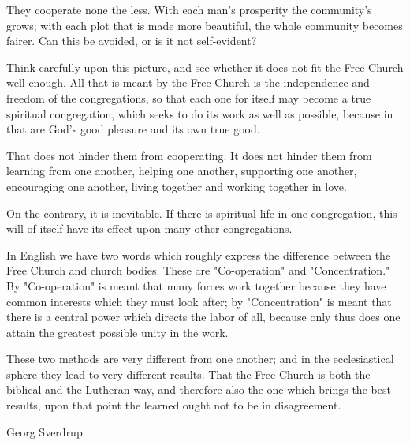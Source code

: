 They cooperate none the less. With each man’s prosperity the community’s grows; with each plot that is made more beautiful, the whole community becomes fairer. Can this be avoided, or is it not self-evident?

Think carefully upon this picture, and see whether it does not fit the Free Church well enough. All that is meant by the Free Church is the independence and freedom of the congregations, so that each one for itself may become a true spiritual congregation, which seeks to do its work as well as possible, because in that are God’s good pleasure and its own true good.

That does not hinder them from cooperating. It does not hinder them from learning from one another, helping one another, supporting one another, encouraging one another, living together and working together in love.

On the contrary, it is inevitable. If there is spiritual life in one congregation, this will of itself have its effect upon many other congregations.

In English we have two words which roughly express the difference between the Free Church and church bodies. These are "Co-operation" and "Concentration." By "Co-operation" is meant that many forces work together because they have common interests which they must look after; by "Concentration" is meant that there is a central power which directs the labor of all, because only thus does one attain the greatest possible unity in the work.

These two methods are very different from one another; and in the ecclesiastical sphere they lead to very different results. That the Free Church is both the biblical and the Lutheran way, and therefore also the one which brings the best results, upon that point the learned ought not to be in disagreement.

Georg Sverdrup.
